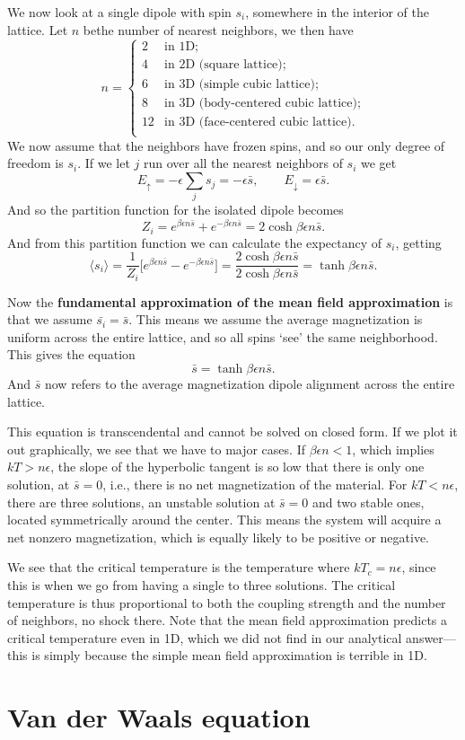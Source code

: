\documentclass[a4paper, 11pt, notitlepage, english]{article}
\newcommand{\up}{\left|\uparrow\rangle\right.}
\newcommand{\down}{\left|\downarrow\rangle\right.}
\newcommand{\eps}{\epsilon}
\renewcommand{\up}{\uparrow}
\renewcommand{\down}{\downarrow}
\begin{document}
We now look at a single dipole with spin $s_i$, somewhere in the interior of the lattice. Let $n$ bethe number of nearest neighbors, we then have
$$n = \begin{cases}
	2 & \mbox{in 1D}; \\
	4 & \mbox{in 2D (square lattice)}; \\
	6 & \mbox{in 3D (simple cubic lattice)}; \\
	8 & \mbox{in 3D (body-centered cubic lattice)}; \\
	12 & \mbox{in 3D (face-centered cubic lattice)}. \\
\end{cases}$$
We now assume that the neighbors have frozen spins, and so our only degree of freedom is $s_i$. If we let $j$ run over all the nearest neighbors of $s_i$ we get
$$E_\up = -\eps \sum_{j} s_j = -\eps\bar{s}, \qquad E_\down = \eps \bar{s}.$$
And so the partition function for the isolated dipole becomes
$$Z_i = e^{\beta \eps n \bar{s}} + e^{-\beta \eps n \bar{s}} = 2\cosh{\beta\eps n\bar{s}}.$$
And from this partition function we can calculate the expectancy of $s_i$, getting
$$\langle s_i \rangle = \frac{1}{Z_i}\bigg[e^{\beta \eps n \bar{s}} - e^{-\beta \eps n \bar{s}} \bigg] = \frac{2\cosh{\beta\eps n\bar{s}}}{2\cosh{\beta\eps n\bar{s}}} = \tanh{\beta\eps n\bar{s}}.$$

Now the \textbf{fundamental approximation of the mean field approximation} is that we assume $\bar{s_i} = \bar{s}$. This means we assume the average magnetization is uniform across the entire lattice, and so all spins `see' the same neighborhood. This gives the equation
$$\bar{s} = \tanh{\beta\eps n\bar{s}}.$$
And $\bar{s}$ now refers to the average magnetization dipole alignment across the entire lattice.

This equation is transcendental and cannot be solved on closed form. If we plot it out graphically, we see that we have to major cases. If $\beta \eps n < 1$, which implies $kT > n\eps$, the slope of the hyperbolic tangent is so low that there is only one solution, at $\bar{s} = 0$, i.e., there is no net magnetization of the material. For $k T < n\eps$, there are three solutions, an unstable solution at $\bar{s} = 0$ and two stable ones, located symmetrically around the center. This means the system will acquire a net nonzero magnetization, which is equally likely to be positive or negative.

We see that the critical temperature is the temperature where $kT_c = n\eps$, since this is when we go from having a single to three solutions. The critical temperature is thus proportional to both the coupling strength and the number of neighbors, no shock there. Note that the mean field approximation predicts a critical temperature even in 1D, which we did not find in our analytical answer---this is simply because the simple mean field approximation is terrible in 1D.



\clearpage



\section*{Van der Waals equation}
\end{document}
